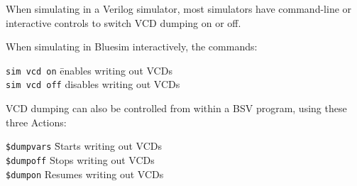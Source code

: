 When simulating in a Verilog simulator, most simulators have
command-line or interactive controls to switch VCD dumping on or off.

When simulating in Bluesim interactively, the commands:

\begin{tabbing}
\hmmmm \= {\tt sim vcd on}  \hmm \= enables writing out VCDs \\
       \> {\tt sim vcd off}      \> disables  writing out VCDs
\end{tabbing}

VCD dumping can also be controlled from within a BSV program, using
these three Actions:

\begin{tabbing}
\hmmmm \= {\tt \$dumpvars} \hmm \= Starts writing out VCDs \\
       \> {\tt \$dumpoff}       \> Stops  writing out VCDs \\
       \> {\tt \$dumpon}        \> Resumes writing out VCDs
\end{tabbing}

